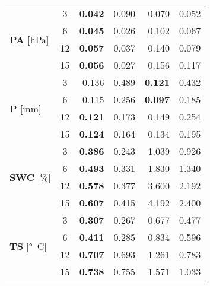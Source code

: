 \begin{table}
\begin{tabular}{p{2.1cm}c|rr|rr}
\cline{1-6}
\multirow[c]{4}{*}{\parbox{2.1cm}{\textbf{PA} [\si{hPa}]}} & 3 & \bfseries 0.042 & 0.090 & 0.070 & 0.052 \\
 & 6 & \bfseries 0.045 & 0.026 & 0.102 & 0.067 \\
 & 12 & \bfseries 0.057 & 0.037 & 0.140 & 0.079 \\
 & 15 & \bfseries 0.056 & 0.027 & 0.156 & 0.117 \\
\cline{1-6}
\multirow[c]{4}{*}{\parbox{2.1cm}{\textbf{P} [\si{mm}]}} & 3 & 0.136 & 0.489 & \bfseries 0.121 & 0.432 \\
 & 6 & 0.115 & 0.256 & \bfseries 0.097 & 0.185 \\
 & 12 & \bfseries 0.121 & 0.173 & 0.149 & 0.254 \\
 & 15 & \bfseries 0.124 & 0.164 & 0.134 & 0.195 \\
\cline{1-6}
\multirow[c]{4}{*}{\parbox{2.1cm}{\textbf{SWC} [\si{\%}]}} & 3 & \bfseries 0.386 & 0.243 & 1.039 & 0.926 \\
 & 6 & \bfseries 0.493 & 0.331 & 1.830 & 1.340 \\
 & 12 & \bfseries 0.578 & 0.377 & 3.600 & 2.192 \\
 & 15 & \bfseries 0.607 & 0.415 & 4.192 & 2.400 \\
\cline{1-6}
\multirow[c]{4}{*}{\parbox{2.1cm}{\textbf{TS} [\si{°C}]}} & 3 & \bfseries 0.307 & 0.267 & 0.677 & 0.477 \\
 & 6 & \bfseries 0.411 & 0.285 & 0.834 & 0.596 \\
 & 12 & \bfseries 0.707 & 0.693 & 1.261 & 0.783 \\
 & 15 & \bfseries 0.738 & 0.755 & 1.571 & 1.033 \\
\cline{1-6}
\bottomrule
\end{tabular}
\end{table}
